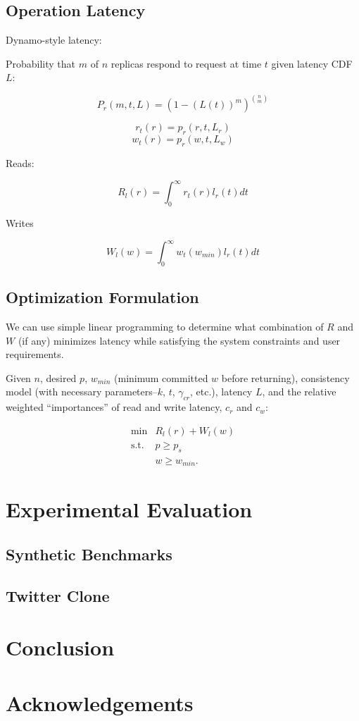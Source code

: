 \documentclass{vldb}
\begin{document}
\subsection{Operation Latency}

Dynamo-style latency:

Probability that $m$ of $n$ replicas respond to request at time $t$ given latency CDF $L$:

$$P_r(m, t, L) = (1-(L(t))^m)^{n \choose m}$$

$$r_t(r) = p_r(r, t, L_r)$$
$$w_t(r) = p_r(w, t, L_w)$$

Reads:

$$R_l(r) = \int_0^{\infty} r_t(r) l_r(t) dt$$

Writes

$$W_l(w) = \int_0^{\infty} w_t(w_{min}) l_r(t) dt$$



\subsection{Optimization Formulation}

We can use simple linear programming to determine what combination of
$R$ and $W$ (if any) minimizes latency while satisfying the system
constraints and user requirements.

Given $n$, desired $p$, $w_{min}$ (minimum committed $w$ before
returning), consistency model (with necessary parameters--$k$, $t$,
$\gamma_{cr}$, etc.), latency $L$, and the relative weighted
``importances'' of read and write latency, $c_r$ and $c_w$:

\begin{equation}
 \begin{array}{rl}
    \min        & R_l(r) +W_l(w) \\
    \mbox{s.t.} & p \ge p_s \\
                & w \ge w_{min}.
    \end{array}
\end{equation}

\section{Experimental Evaluation}
\label{sec:implement}

\subsection{Synthetic Benchmarks}

\subsection{Twitter Clone}

\section{Conclusion}

\section*{Acknowledgements}

\balance



\end{document}
